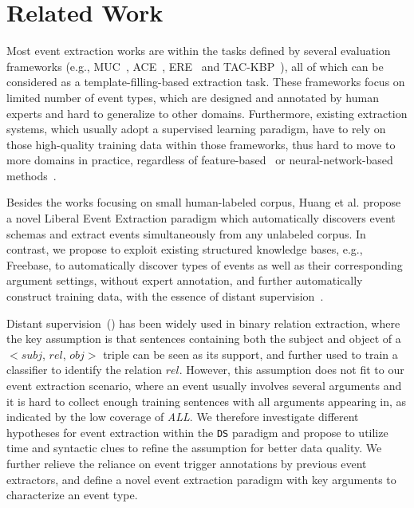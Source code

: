 \section{Related Work}
Most event extraction works are within the tasks defined by several evaluation frameworks (e.g., MUC~\cite{grishman1996message}, 
ACE~\cite{doddington2004automatic}, ERE~\cite{song2015light} and TAC-KBP~\cite{mitamura2015event}), 
all of which can be considered as a template-filling-based extraction task.
These frameworks focus on limited number of event types, which are designed and annotated by human experts and
hard to generalize to other domains.  
Furthermore, existing extraction systems, which usually adopt a supervised learning paradigm, 
have to rely on those high-quality training data within those frameworks, 
thus hard to move to more domains in practice, regardless of feature-based~\cite{gupta2009predicting,hong2011using,li2013joint} or neural-network-based methods~\cite{chen2015event,nguyen2016joint}.

Besides the works focusing on small human-labeled corpus, 
Huang et al.   propose a novel Liberal Event Extraction paradigm 
which automatically discovers event schemas and extract events simultaneously from any unlabeled corpus. 
In contrast, we propose to exploit existing structured knowledge bases, e.g., Freebase, to automatically discover 
types of events as well as their corresponding argument settings, without expert annotation, and further automatically
construct training data, with the essence of distant supervision~\cite{mintz2009distant}.

Distant supervision~(\DS) has been widely used in binary relation extraction, where the key assumption is that 
 sentences containing both the subject and object of a $<$$subj$, $rel$, $obj$$>$ triple can be seen as its support, and further
used to train a classifier to identify the relation $rel$. However,  this assumption does not fit to our event extraction scenario, 
where an event usually involves several arguments and it is hard to collect enough training sentences with all arguments appearing in, as indicated by the low coverage of \textit{ALL}. We therefore investigate different hypotheses  for event extraction within the \texttt{DS} paradigm and propose to utilize time and syntactic clues to refine the \DS assumption for better data quality. We further relieve the reliance on event trigger annotations by previous event extractors, and define a novel event extraction paradigm with key arguments to characterize an event type. 

